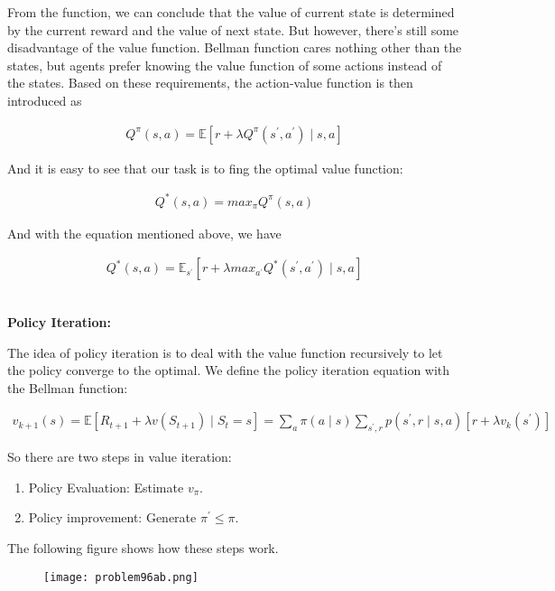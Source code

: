 \documentclass[a4paper,12pt]{article}
\begin{document}
From the function, we can conclude that the value of current state is determined by the current reward and the value of next state. But however, there's still some disadvantage of the value function. Bellman function cares nothing other than the states, but agents prefer knowing the value function of some actions instead of the states. Based on these requirements, the action-value function is then introduced as

\begin{align*}
Q^{\pi}(s,a) = \mathbb{E}[r +\lambda Q^{\pi}(s^{'}, a^{'}) \mid s,a]
\end{align*}

And it is easy to see that our task is to fing the optimal value function:

\begin{align*}
Q^{*}(s,a) = max_{\pi}Q^{\pi}(s,a)
\end{align*}

And with the equation mentioned above, we have

\begin{align*}
Q^{*}(s,a) = \mathbb{E}_{s^{'}}[r +\lambda max_{a^{'}}Q^{*}(s^{'}, a^{'}) \mid s,a]
\end{align*}


~\\

\textbf{Policy Iteration:}

The idea of policy iteration is to deal with the value function recursively to let the policy converge to the optimal. We define the policy iteration equation with the Bellman function:

\begin{align*}
v_{k+1}(s) = \mathbb{E}[R_{t+1} + \lambda v(S_{t+1}) \mid S_t = s] = \sum_{a} \pi(a\mid s) \sum_{s^{'},r} p(s^{'},r \mid s,a)[r + \lambda v_{k} (s^{'})]
\end{align*}

So there are two steps in value iteration:

\begin{enumerate}
\item Policy Evaluation: Estimate $v_{\pi}$.
\item Policy improvement: Generate $\pi^{'} \leq \pi$.
\end{enumerate}

The following figure shows how these steps work.

\begin{figure}[H]
    \centering
    \texttt{[image: problem96ab.png]}
\end{figure}
\end{document}

